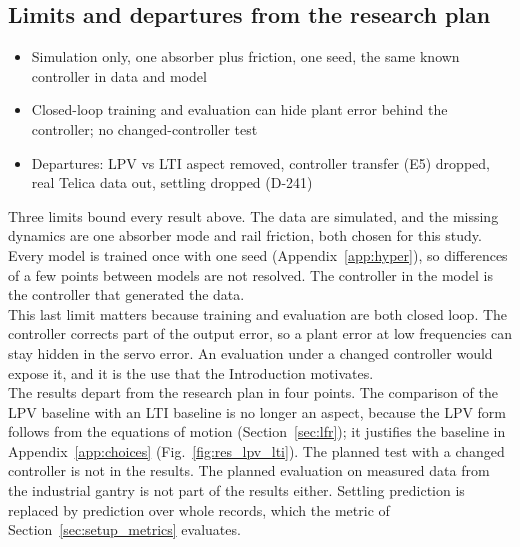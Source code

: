 \subsection{Limits and departures from the research plan}
\ifdraft
\begin{itemize}
\item Simulation only, one absorber plus friction, one seed, the same known controller in data and model
\item Closed-loop training and evaluation can hide plant error behind the controller; no changed-controller test
\item Departures: LPV vs LTI aspect removed, controller transfer (E5) dropped, real Telica data out, settling dropped (D-241)
\end{itemize}
\fi
Three limits bound every result above.
The data are simulated, and the missing dynamics are one absorber mode and
rail friction, both chosen for this study.
Every model is trained once with one seed (Appendix~\ref{app:hyper}), so
differences of a few points between models are not resolved.
The controller in the model is the controller that generated the data.
\\
This last limit matters because training and evaluation are both closed
loop.
The controller corrects part of the output error, so a plant error at low
frequencies can stay hidden in the servo error.
An evaluation under a changed controller would expose it, and it is the use
that the Introduction motivates.
\\
The results depart from the research plan in four points.
The comparison of the LPV baseline with an LTI baseline is no longer an
aspect, because the LPV form follows from the equations of motion
(Section~\ref{sec:lfr}); it justifies the baseline in
Appendix~\ref{app:choices} (Fig.~\ref{fig:res_lpv_lti}).
The planned test with a changed controller is not in the results.
The planned evaluation on measured data from the industrial gantry is not
part of the results either.
Settling prediction is replaced by prediction over whole records, which the
metric of Section~\ref{sec:setup_metrics} evaluates.

